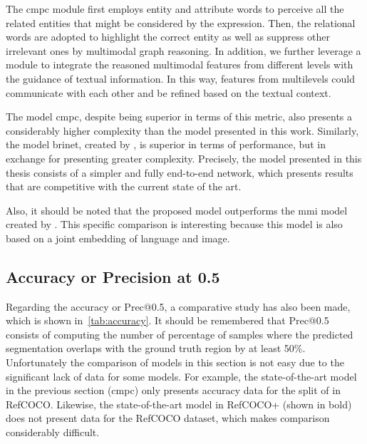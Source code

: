 \begin{quoteBox}
  The \gls{cmpc} module first employs entity and attribute words to perceive
  all the related entities that might be considered by the expression. Then,
  the relational words are adopted to highlight the correct entity as well as
  suppress other irrelevant ones by multimodal graph reasoning. In addition, we
  further leverage a module to integrate the reasoned multimodal features from
  different levels with the guidance of textual information. In this way,
  features from multilevels could communicate with each other and be refined
  based on the textual context.
  \tcblower{}
\end{quoteBox}

The model \gls{cmpc}, despite being superior in terms of this metric, also
presents a considerably higher complexity than the model presented in this
work. Similarly, the model \gls{brinet}, created by
, is superior in terms of performance,
but in exchange for presenting greater complexity. Precisely, the model
presented in this thesis consists of a simpler and fully end-to-end network,
which presents results that are competitive with the current state of the art.

Also, it should be noted that the proposed model outperforms the \gls{mmi}
model created by . This specific comparison is interesting
because this model is also based on a joint embedding of language and image.


\subsection{Accuracy or Precision at 0.5}\label{sec:accuracy}

Regarding the accuracy or Prec@0.5, a comparative study has also been made,
which is shown in\ \vref{tab:accuracy}. It should be remembered that Prec@0.5
consists of computing the number of percentage of samples where the predicted
segmentation overlaps with the ground truth region by at least
50\%. Unfortunately the comparison of models in this section is not easy due to
the significant lack of data for some models. For example, the state-of-the-art
model in the previous section (\gls{cmpc}) only presents accuracy data for the
split of  in RefCOCO\@. Likewise, the state-of-the-art model in
RefCOCO+ (shown in bold) does not present data for the RefCOCO dataset, which
makes comparison considerably difficult.

